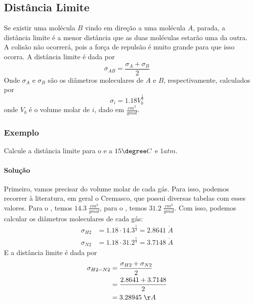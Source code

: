 \subsection{Distância Limite}
Se existir uma molécula \(B\) vindo em direção a uma molécula \(A\), parada, a distância limite é a
menor distância que as duas moléculas estarão uma da outra. A colisão não ocorrerá, pois a força de
repulsão é muito grande para que isso ocorra. A distância limite é dada por
\begin{equation}\label{eq:distancia_limiteAB}
    \sigma_{AB} = \frac{\sigma_A + \sigma_B}{2}
\end{equation}
Onde \(\sigma_A\) e \(\sigma_B\) são os diâmetros moleculares de \(A\) e \(B\), respectivamente,
calculados por
\begin{equation}\label{eq:diametro molecular}
    \sigma_i =  1.18 V_{b}^{\frac{1}{3}}
\end{equation} 
onde \(V_{b}\) é o volume molar de \(i\), dado em \(\frac{cm^{3}}{gmol}\).
\subsubsection{Exemplo}\label{ex:distancia_limite}
 Calcule a distância limite para o  e  a \(15\degree C\) e \(1 atm\).
\paragraph{Solução}
Primeiro, vamos precisar do volume molar de cada gás. Para isso, podemos recorrer à literatura, em
geral o Cremasco, que possui diversas tabelas com esses valores. Para o , temos \(14.3 \;
\frac{cm^{3}}{gmol}\), para o , temos \(31.2 \; \frac{cm^{3}}{gmol}\). Com isso, podemos
calcular os diâmetros moleculares de cada gás:
\begin{align}
    \sigma_{H2} &= 1.18 \cdot 14.3^{\frac{1}{3}} = 2.8641 \; \mathring{A} \\
    \sigma_{N2} &= 1.18 \cdot 31.2^{\frac{1}{3}} = 3.7148 \; \mathring{A}
\end{align}
E a distância limite é dada por
\begin{align}
    \sigma_{H2-N2} &= \frac{\sigma_{H2} + \sigma_{N2}}{2} \\
    &= \frac{2.8641 + 3.7148}{2} \\
    &= 3.28945 \; \AA
\end{align}

